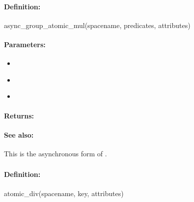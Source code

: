 \paragraph{Definition:}
\begin{rubycode}
async_group_atomic_mul(spacename, predicates, attributes)
\end{rubycode}

\paragraph{Parameters:}
\begin{itemize}[noitemsep]
\item {}\\

\item {}\\

\item {}\\

\end{itemize}

\paragraph{Returns:}


\paragraph{See also:}  This is the asynchronous form of .

\pagebreak
\subsubsection{}
\label{api:ruby:atomic_div}


\paragraph{Definition:}
\begin{rubycode}
atomic_div(spacename, key, attributes)
\end{rubycode}

